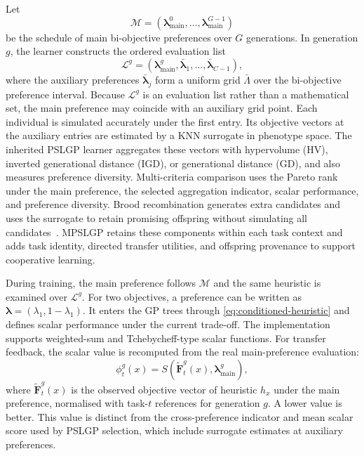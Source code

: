 \documentclass[10pt,journal]{IEEEtran}
\begin{document}
Let
\begin{equation}
    \mathcal{M}=\left(\boldsymbol{\lambda}_{\mathrm{main}}^0,
    \ldots,\boldsymbol{\lambda}_{\mathrm{main}}^{G-1}\right)
\end{equation}
be the schedule of main bi-objective preferences over $G$ generations. In generation $g$, the learner constructs the ordered evaluation list
\begin{equation}
    \mathcal{L}^{g}=\left(\boldsymbol{\lambda}_{\mathrm{main}}^g,
    \bar{\boldsymbol{\lambda}}_1,\ldots,
    \bar{\boldsymbol{\lambda}}_{C-1}\right),
    \label{eq:preference-list}
\end{equation}
where the auxiliary preferences $\bar{\boldsymbol{\lambda}}_j$ form a uniform grid $\bar{\Lambda}$ over the bi-objective preference interval. Because $\mathcal{L}^g$ is an evaluation list rather than a mathematical set, the main preference may coincide with an auxiliary grid point. Each individual is simulated accurately under the first entry. Its objective vectors at the auxiliary entries are estimated by a KNN surrogate in phenotype space. The inherited PSLGP learner aggregates these vectors with hypervolume (HV), inverted generational distance (IGD), or generational distance (GD), and also measures preference diversity. Multi-criteria comparison uses the Pareto rank under the main preference, the selected aggregation indicator, scalar performance, and preference diversity. Brood recombination generates extra candidates and uses the surrogate to retain promising offspring without simulating all candidates~\cite{xu2026pslgp}. MPSLGP retains these components within each task context and adds task identity, directed transfer utilities, and offspring provenance to support cooperative learning.

During training, the main preference follows $\mathcal{M}$ and the same heuristic is examined over $\mathcal{L}^g$. For two objectives, a preference can be written as $\boldsymbol{\lambda}=(\lambda_1,1-\lambda_1)$. It enters the GP trees through \eqref{eq:conditioned-heuristic} and defines scalar performance under the current trade-off. The implementation supports weighted-sum and Tchebycheff-type scalar functions. For transfer feedback, the scalar value is recomputed from the real main-preference evaluation:
\begin{equation}
    \phi_t^g(x)=S\left(\widetilde{\mathbf{F}}_t^g(x),
    \boldsymbol{\lambda}_{\mathrm{main}}^g\right),
    \label{eq:scalar}
\end{equation}
where $\widetilde{\mathbf{F}}_t^g(x)$ is the observed objective vector of heuristic $h_x$ under the main preference, normalised with task-$t$ references for generation $g$. A lower value is better. This value is distinct from the cross-preference indicator and mean scalar score used by PSLGP selection, which include surrogate estimates at auxiliary preferences.
\end{document}
